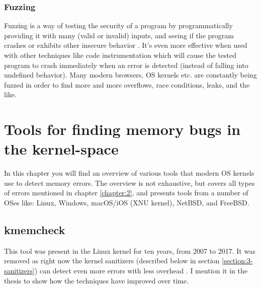 \documentclass[shortabstract, manyadvisors, english, mgr]{iithesis}
\theoremstyle{definition} \newtheorem*{definition}{Definicja}
\theoremstyle{definition} \newtheorem*{example}{Przykład}
\theoremstyle{definition} \newtheorem*{remark}{Uwaga}
\begin{document}
\subsection{Fuzzing}
Fuzzing is a way of testing the security of a program by programmatically providing it with many (valid or invalid) inputs, and seeing if the program crashes or exhibits other insecure behavior \cite{bib:fuzzing}. It's even more effective when used with other techniques like code instrumentation which will cause the tested program to crash immediately when an error is detected (instead of falling into undefined behavior). Many modern browsers, OS kernels etc. are constantly being fuzzed in order to find more and more overflows, race conditions, leaks, and the like.

\chapter{Tools for finding memory bugs in the kernel-space}
\label{chapter:3}
In this chapter you will find an overview of various tools that modern OS kernels use to detect memory errors. The overview is not exhaustive, but covers all types of errors mentioned in chapter \ref{chapter:2}, and presents tools from a number of OSes like: Linux, Windows, macOS/iOS (XNU kernel), NetBSD, and FreeBSD.

\section{kmemcheck}
\label{lbl:kmemcheck}
This tool was present in the Linux kernel for ten years, from 2007 to 2017. It was removed as right now the kernel sanitizers (described below in section \ref{section:3-sanitizers}) can detect even more errors with less overhead \cite{bib:memcheck-sanitizers-1} \cite{bib:memcheck-sanitizers-2}. I mention it in the thesis to show how the techniques have improved over time.
\end{document}
